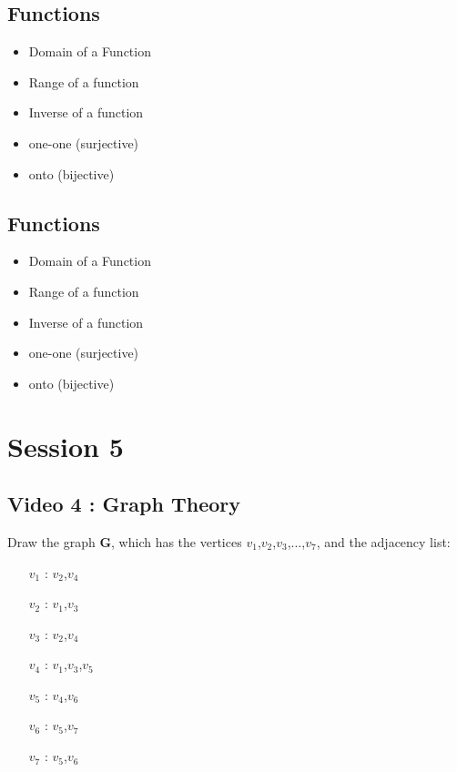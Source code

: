\documentclass[]{report}
\begin{document}
\section*{Functions}
\begin{itemize}
	\item Domain of a Function
	\item Range of a function
	\item Inverse of a function
\end{itemize}
\begin{itemize}
	\item one-one (surjective)
	\item onto (bijective)
\end{itemize}


\section*{Functions}
\begin{itemize}
	\item Domain of a Function
	\item Range of a function
	\item Inverse of a function
\end{itemize}
\begin{itemize}
	\item one-one (surjective)
	\item onto (bijective)
\end{itemize}

\chapter{Session 5}
\section{Video 4 : Graph Theory}

\Large
\vspace{-0.7cm}
Draw the graph \textbf{G}, which has the vertices $v_1$,$v_2$,$v_3$,$\ldots$,$v_7$, and the adjacency list:

\begin{itemize}
	\item[$v_1$]: $v_2$,$v_4$
	\item[$v_2$]: $v_1$,$v_3$
	\item[$v_3$]: $v_2$,$v_4$
	\item[$v_4$]: $v_1$,$v_3$,$v_5$
	\item[$v_5$]: $v_4$,$v_6$
	\item[$v_6$]: $v_5$,$v_7$
	\item[$v_7$]: $v_5$,$v_6$
\end{itemize}
\end{document}
